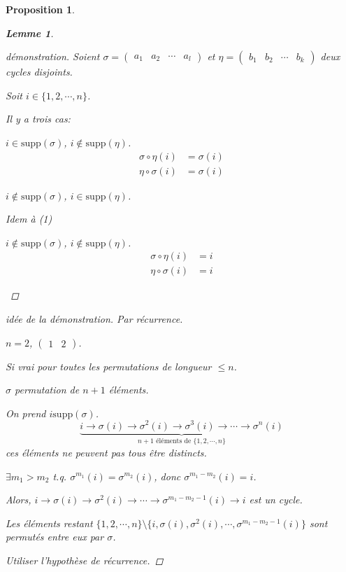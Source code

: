\documentclass{report}
\newtheorem*{lem}{Lemme}
\newtheorem*{prop}{Proposition}
\theoremstyle{definition}
\theoremstyle{remark}
\begin{document}
\begin{prop}
\begin{lem}
\begin{proof}[d\'emonstration]
				Soient $\sigma=\begin{pmatrix}
					a_1&a_2&\dotsb&a_l
				\end{pmatrix}$ et $\eta=\begin{pmatrix}
				b_1&b_2&\dotsb&b_k
				\end{pmatrix}$ deux cycles disjoints.

				Soit $i \in \{1,2,\dotsb,n\}$.

				Il y a trois cas:
				\begin{nlist}
					\item $i \in \mathrm{supp}(\sigma)$, $i \notin \mathrm{supp}(\eta)$.
					\begin{align*}
						\sigma \circ \eta(i)&= \sigma(i)\\
						\eta \circ \sigma(i)&= \sigma(i)
					\end{align*}
					\item $i \notin \mathrm{supp}(\sigma)$, $i \in \mathrm{supp}(\eta)$.

					Idem \`a (1)
					\item $i \notin \mathrm{supp}(\sigma)$, $i \notin \mathrm{supp}(\eta)$.
					\begin{align*}
						\sigma \circ \eta(i)&= i\\
						\eta \circ \sigma(i)&=i
					\end{align*}
				\end{nlist}
			\end{proof}
		\end{lem}
		\begin{proof}[id\'ee de la d\'emonstration]
			Par r\'ecurrence.

			$n=2$, $\begin{pmatrix}
				1&2
			\end{pmatrix}$.

			Si vrai pour toutes les permutations de longueur $\leq n$.

			$\sigma$ permutation de $n+1$ \'el\'ements.

			On prend $i \mathrm{supp}(\sigma)$.
			\[
			\underbrace{i \to \sigma(i) \to \sigma^2(i) \to \sigma^3(i) \to \dotsb \to \sigma^n(i)}_{n+1\text{ \'el\'ements de }\{1,2,\dotsb,n\}}
			\]
			ces \'el\'ements ne peuvent pas tous \^etre distincts.

			$\exists m_1>m_2$ t.q. $\sigma^{m_1}(i) = \sigma^{m_2}(i)$, donc $\sigma^{m_1-m_2}(i) = i$.

			Alors, $i \to \sigma(i) \to \sigma^2(i) \to \dotsb \to \sigma^{m_1-m_2-1}(i) \to i$ est un cycle.

			Les \'el\'ements restant $\{1,2,\dotsb,n\} \setminus \{i, \sigma(i), \sigma^2(i), \dotsb, \sigma^{m_1-m_2-1}(i)\}$ sont permut\'es entre eux par $\sigma$.

			Utiliser l'hypoth\`ese de r\'ecurrence.
			\renewcommand{\qedsymbol}{\#}
		\end{proof}
		\renewcommand{\qedsymbol}{$\square$}
	\end{prop}
\end{document}
